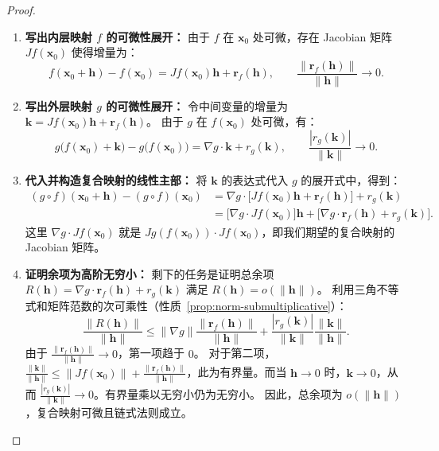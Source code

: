 \documentclass[lang=cn,11pt]{elegantbook}
\begin{document}
\begin{proof}
\begin{enumerate}
  \item \textbf{写出内层映射 $f$ 的可微性展开：}
  由于 $f$ 在 $\boldsymbol x_0$ 处可微，存在 Jacobian 矩阵 $Jf(\boldsymbol x_0)$ 使得增量为：
  \[
  f(\boldsymbol x_0+\boldsymbol h)-f(\boldsymbol x_0)
  =Jf(\boldsymbol x_0)\boldsymbol h+\boldsymbol r_f(\boldsymbol h),
  \qquad\frac{\|\boldsymbol r_f(\boldsymbol h)\|}{\|\boldsymbol h\|}\to 0.
  \]
  
  \item \textbf{写出外层映射 $g$ 的可微性展开：}
  令中间变量的增量为 $\boldsymbol k=Jf(\boldsymbol x_0)\boldsymbol h+\boldsymbol r_f(\boldsymbol h)$。
  由于 $g$ 在 $f(\boldsymbol x_0)$ 处可微，有：
  \[
  g\bigl(f(\boldsymbol x_0)+\boldsymbol k\bigr)-g\bigl(f(\boldsymbol x_0)\bigr)
  =\nabla g\cdot\boldsymbol k+r_g(\boldsymbol k),
  \qquad\frac{|r_g(\boldsymbol k)|}{\|\boldsymbol k\|}\to 0.
  \]
  
  \item \textbf{代入并构造复合映射的线性主部：}
  将 $\boldsymbol k$ 的表达式代入 $g$ 的展开式中，得到：
  \begin{align*}
  (g\circ f)(\boldsymbol x_0+\boldsymbol h)-(g\circ f)(\boldsymbol x_0) 
  &= \nabla g \cdot \bigl[Jf(\boldsymbol x_0)\boldsymbol h+\boldsymbol r_f(\boldsymbol h)\bigr] + r_g(\boldsymbol k) \\
  &= \bigl[\nabla g \cdot Jf(\boldsymbol x_0)\bigr]\boldsymbol h + \bigl[\nabla g \cdot \boldsymbol r_f(\boldsymbol h) + r_g(\boldsymbol k)\bigr].
  \end{align*}
  这里 $\nabla g \cdot Jf(\boldsymbol x_0)$ 就是 $Jg(f(\boldsymbol x_0))\cdot Jf(\boldsymbol x_0)$，即我们期望的复合映射的 Jacobian 矩阵。
  
  \item \textbf{证明余项为高阶无穷小：}
  剩下的任务是证明总余项 $R(\boldsymbol h) = \nabla g \cdot \boldsymbol r_f(\boldsymbol h) + r_g(\boldsymbol k)$ 满足 $R(\boldsymbol h) = o(\|\boldsymbol h\|)$。
  利用三角不等式和矩阵范数的次可乘性（性质~\ref{prop:norm-submultiplicative}）：
  \[
  \frac{\|R(\boldsymbol h)\|}{\|\boldsymbol h\|} \leq \|\nabla g\| \frac{\|\boldsymbol r_f(\boldsymbol h)\|}{\|\boldsymbol h\|} + \frac{|r_g(\boldsymbol k)|}{\|\boldsymbol k\|} \frac{\|\boldsymbol k\|}{\|\boldsymbol h\|}.
  \]
  由于 $\frac{\|\boldsymbol r_f(\boldsymbol h)\|}{\|\boldsymbol h\|} \to 0$，第一项趋于 $0$。
  对于第二项，$\frac{\|\boldsymbol k\|}{\|\boldsymbol h\|} \leq \|Jf(\boldsymbol x_0)\| + \frac{\|\boldsymbol r_f(\boldsymbol h)\|}{\|\boldsymbol h\|}$，此为有界量。而当 $\boldsymbol h \to 0$ 时，$\boldsymbol k \to 0$，从而 $\frac{|r_g(\boldsymbol k)|}{\|\boldsymbol k\|} \to 0$。有界量乘以无穷小仍为无穷小。
  因此，总余项为 $o(\|\boldsymbol h\|)$，复合映射可微且链式法则成立。
\end{enumerate}
\end{proof}
\end{document}
